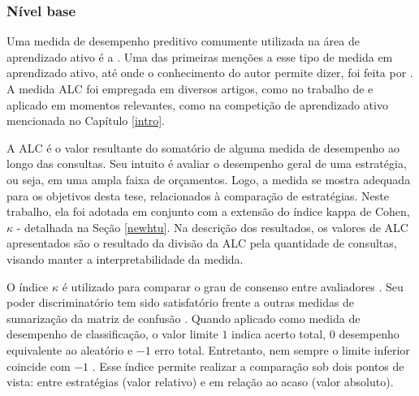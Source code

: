 \subsubsection{Nível base}\label{metrbase}

Uma medida de desempenho preditivo comumente utilizada na área de aprendizado ativo é a .
Uma das primeiras menções a esse tipo de medida em aprendizado ativo, até onde o conhecimento do autor permite dizer, foi feita por .
A medida ALC foi empregada em diversos artigos, como no trabalho de  e aplicado em momentos relevantes, como na competição de aprendizado ativo mencionada no Capítulo \ref{intro}.

A ALC é o valor resultante do somatório de alguma medida de desempenho ao longo das consultas.
Seu intuito é avaliar o desempenho geral de uma estratégia, ou seja, em uma ampla faixa de orçamentos.
Logo, a medida se mostra adequada para os objetivos desta tese, relacionados à comparação de estratégias.
Neste trabalho, ela foi adotada em conjunto com a extensão do índice kappa de Cohen, $\kappa$ - detalhada na Seção \ref{newhtu}.
Na descrição dos resultados, os valores de ALC apresentados são o resultado da divisão da ALC pela quantidade de consultas, visando manter a interpretabilidade da medida.

O índice $\kappa$ é utilizado para comparar o grau de consenso entre avaliadores \cite{journals/coling/EugenioG04}.
Seu poder discriminatório tem sido satisfatório frente a outras medidas de sumarização da matriz de confusão \cite{conf/acivs/DemirkesenC08}.
Quando aplicado como medida de desempenho de classificação, o valor limite $1$ indica acerto total, $0$ desempenho equivalente ao aleatório e $-1$ erro total. Entretanto, nem sempre o limite inferior coincide com $-1$ \cite{journals/ese/Emam99}.
Esse índice permite realizar a comparação sob dois pontos de vista: entre estratégias (valor relativo) e em relação ao acaso (valor absoluto).

